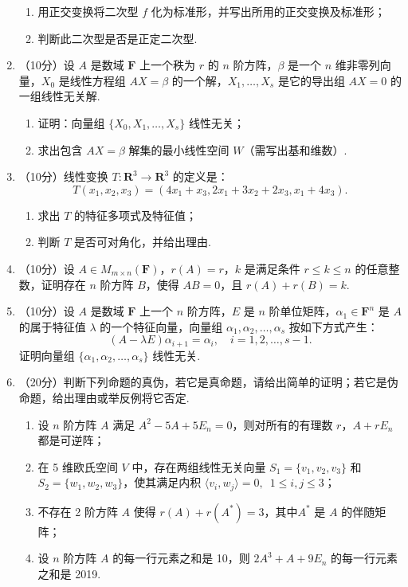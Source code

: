 \begin{enumerate}
\begin{enumerate}
        \item 用正交变换将二次型 $f$ 化为标准形，并写出所用的正交变换及标准形；

        \item 判断此二次型是否是正定二次型.
    \end{enumerate}
	\item （10分）设 $A$ 是数域 $\mathbf{F}$ 上一个秩为 $r$ 的 $n$ 阶方阵，$\beta$ 是一个 $n$ 维非零列向量，$X_0$ 是线性方程组 $AX=\beta$ 的一个解，$X_1,\ldots,X_s$ 是它的导出组 $AX=0$ 的一组线性无关解.
    \begin{enumerate}
        \item 证明：向量组 $\{X_0, X_1,\ldots,X_s\}$ 线性无关；

        \item 求出包含 $AX=\beta$ 解集的最小线性空间 $W$（需写出基和维数）.
    \end{enumerate}
	\item （10分）线性变换 $T \colon \mathbf{R}^3 \to \mathbf{R}^3$ 的定义是：
    \[T(x_1,x_2,x_3)=(4x_1+x_3,2x_1+3x_2+2x_3,x_1+4x_3).\]
    \begin{enumerate}
        \item 求出 $T$ 的特征多项式及特征值；

        \item 判断 $T$ 是否可对角化，并给出理由.
    \end{enumerate}
	\item （10分）设 $A \in M_{m \times n}(\mathbf{F})$，$r(A)=r$，$k$ 是满足条件 $r \leqslant k \leqslant n$ 的任意整数，证明存在 $n$ 阶方阵 $B$，使得 $AB=0$，且 $r(A)+r(B)=k$.

    \item （10分）设 $A$ 是数域 $\mathbf{F}$ 上一个 $n$ 阶方阵，$E$ 是 $n$ 阶单位矩阵，$\alpha_1 \in \mathbf{F}^n$ 是 $A$ 的属于特征值 $\lambda$ 的一个特征向量，向量组 $\alpha_1,\alpha_2,\ldots,\alpha_s$ 按如下方式产生：
    \[(A-\lambda E)\alpha_{i+1}=\alpha_i,\quad i=1,2,\ldots,s-1.\]
    证明向量组 $\{\alpha_1,\alpha_2,\ldots,\alpha_s\}$ 线性无关.

    \item （20分）判断下列命题的真伪，若它是真命题，请给出简单的证明；若它是伪命题，给出理由或举反例将它否定.
    \begin{enumerate}
        \item 设 $n$ 阶方阵 $A$ 满足 $A^2-5A+5E_n=0$，则对所有的有理数 $r$，$A+rE_n$ 都是可逆阵；

        \item 在 5 维欧氏空间 $V$ 中，存在两组线性无关向量 $S_1=\{v_1,v_2,v_3\}$ 和 $S_2=\{w_1,w_2,w_3\}$，使其满足内积 $\langle v_i,w_j\rangle=0,\enspace 1 \leqslant i,j \leqslant 3$；

        \item 不存在 2 阶方阵 $A$ 使得 $r(A)+r(A^*)=3$，其中$A^*$ 是 $A$ 的伴随矩阵；

        \item 设 $n$ 阶方阵 $A$ 的每一行元素之和是 10，则 $2A^3+A+9E_n$ 的每一行元素之和是 2019.
    \end{enumerate}
\end{enumerate}

\clearpage
